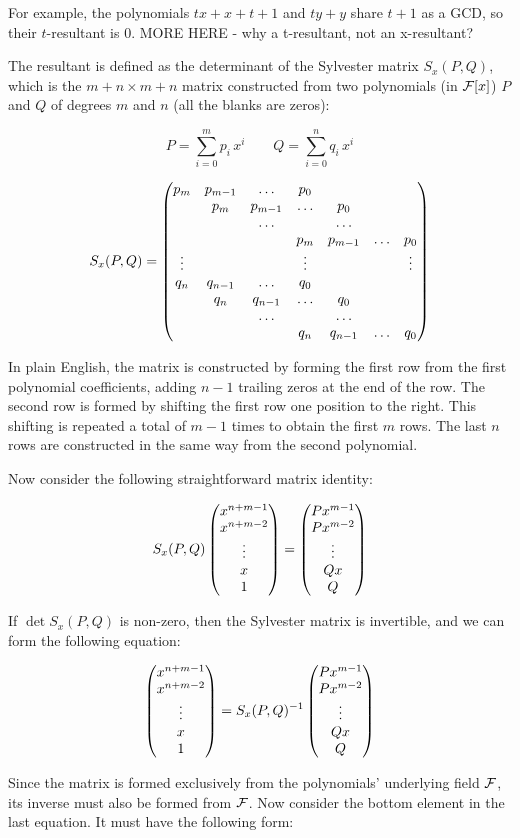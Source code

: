 For example, the polynomials $t x+x+t+1$ and $ty + y$ share $t+1$
as a GCD, so their $t$-resultant is 0.  MORE HERE - why a t-resultant,
not an x-resultant?

The resultant is defined as the determinant of the Sylvester matrix
$S_x(P,Q)$, which is the $m+n \times m+n$ matrix constructed from two
polynomials (in ${\cal F}[x]$) $P$ and $Q$ of degrees $m$ and $n$ (all
the blanks are zeros):

$$ P = \sum_{i=0}^m p_i \, x^i \qquad Q = \sum_{i=0}^n q_i \, x^i $$

$$ S_x(P,Q) = \begin{pmatrix}
  p_m & p_{m-1} & \ldots & p_0 & & & \cr
  & p_m & p_{m-1} & \ldots & p_0 & & \cr
  & & \ldots & & \ldots & & \cr
  & & & p_m & p_{m-1} & \ldots & p_0 \cr
  \vdots & & & \vdots & & & \vdots \cr
  q_n & q_{n-1} & \ldots & q_0 & & & \cr
  & q_n & q_{n-1} & \ldots & q_0 & & \cr
  & & \ldots & & \ldots & & \cr
  & & & q_n & q_{n-1} & \ldots & q_0 \cr
  \end{pmatrix} $$

In plain English, the matrix is constructed by forming the first row
from the first polynomial coefficients, adding $n-1$ trailing zeros at
the end of the row.  The second row is formed by shifting the first
row one position to the right.  This shifting is repeated a total of
$m-1$ times to obtain the first $m$ rows.  The last $n$ rows are
constructed in the same way from the second polynomial.

Now consider the following straightforward matrix identity:

$$ S_x(P,Q) \begin{pmatrix}x^{n+m-1}\cr x^{n+m-2}\cr \vdots \cr x \cr 1\end{pmatrix}
 = \begin{pmatrix}P x^{m-1}\cr P x^{m-2}\cr \vdots \cr Q x \cr Q\end{pmatrix} $$

If $\det S_x(P,Q)$ is non-zero, then the Sylvester matrix is
invertible, and we can form the following equation:

$$ \begin{pmatrix}x^{n+m-1}\cr x^{n+m-2}\cr \vdots \cr x \cr 1\end{pmatrix}
 = S_x(P,Q)^{-1} \begin{pmatrix}P x^{m-1}\cr P x^{m-2}\cr \vdots \cr Q x \cr Q\end{pmatrix} $$

Since the matrix is formed exclusively from the polynomials'
underlying field ${\cal F}$, its inverse must also be formed from
${\cal F}$.  Now consider the bottom element in the last equation.  It
must have the following form:

